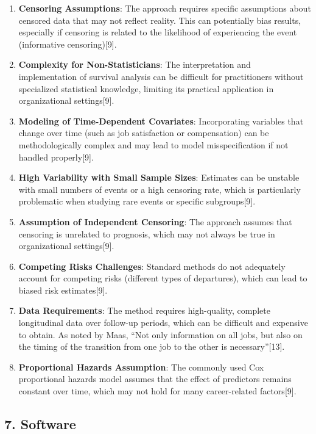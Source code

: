 \documentclass[
  letterpaper,
  DIV=11,
  numbers=noendperiod]{scrartcl}
\begin{document}
\begin{enumerate}
\def\labelenumi{\arabic{enumi}.}
\item
  \textbf{Censoring Assumptions}: The approach requires specific
  assumptions about censored data that may not reflect reality. This can
  potentially bias results, especially if censoring is related to the
  likelihood of experiencing the event (informative censoring){[}9{]}.
\item
  \textbf{Complexity for Non-Statisticians}: The interpretation and
  implementation of survival analysis can be difficult for practitioners
  without specialized statistical knowledge, limiting its practical
  application in organizational settings{[}9{]}.
\item
  \textbf{Modeling of Time-Dependent Covariates}: Incorporating
  variables that change over time (such as job satisfaction or
  compensation) can be methodologically complex and may lead to model
  misspecification if not handled properly{[}9{]}.
\item
  \textbf{High Variability with Small Sample Sizes}: Estimates can be
  unstable with small numbers of events or a high censoring rate, which
  is particularly problematic when studying rare events or specific
  subgroups{[}9{]}.
\item
  \textbf{Assumption of Independent Censoring}: The approach assumes
  that censoring is unrelated to prognosis, which may not always be true
  in organizational settings{[}9{]}.
\item
  \textbf{Competing Risks Challenges}: Standard methods do not
  adequately account for competing risks (different types of
  departures), which can lead to biased risk estimates{[}9{]}.
\item
  \textbf{Data Requirements}: The method requires high-quality, complete
  longitudinal data over follow-up periods, which can be difficult and
  expensive to obtain. As noted by Maas, ``Not only information on all
  jobs, but also on the timing of the transition from one job to the
  other is necessary''{[}13{]}.
\item
  \textbf{Proportional Hazards Assumption}: The commonly used Cox
  proportional hazards model assumes that the effect of predictors
  remains constant over time, which may not hold for many career-related
  factors{[}9{]}.
\end{enumerate}

\subsection{7. Software}\label{software}
\end{document}
